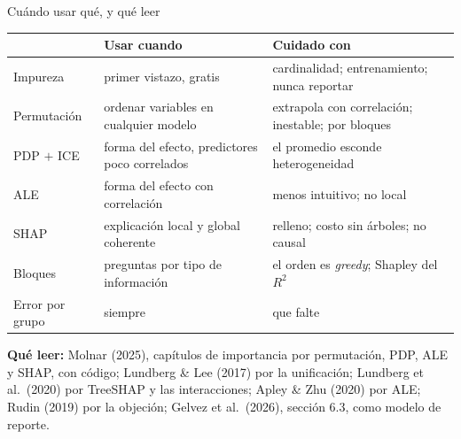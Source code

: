 \documentclass{beamer}
\newcommand{\1}{\mathbb{I}}
\begin{document}
\begin{frame}{Cuándo usar qué, y qué leer}
\small
\begin{center}
\scriptsize
\setlength{\tabcolsep}{4pt}
\renewcommand{\arraystretch}{1.1}
\begin{tabular}{lp{4.3cm}p{4.4cm}}
\hline
 & Usar cuando & Cuidado con \\
\hline
Impureza & primer vistazo, gratis & cardinalidad; entrenamiento; nunca reportar \\
Permutación & ordenar variables en cualquier modelo & extrapola con correlación; inestable; por bloques \\
PDP $+$ ICE & forma del efecto, predictores poco correlados & el promedio esconde heterogeneidad \\
ALE & forma del efecto con correlación & menos intuitivo; no local \\
SHAP & explicación local y global coherente & relleno; costo sin árboles; no causal \\
Bloques & preguntas por tipo de información & el orden es \emph{greedy}; Shapley del $R^2$ \\
Error por grupo & siempre & que falte \\
\hline
\end{tabular}
\end{center}
\pause
\vspace{0.05cm}
\textbf{Qué leer:} Molnar (2025), capítulos de importancia por permutación, PDP, ALE y SHAP, con código; Lundberg \& Lee (2017) por la unificación; Lundberg et al.\ (2020) por TreeSHAP y las interacciones; Apley \& Zhu (2020) por ALE; Rudin (2019) por la objeción; Gelvez et al.\ (2026), sección 6.3, como modelo de reporte.
\end{frame}
\end{document}
